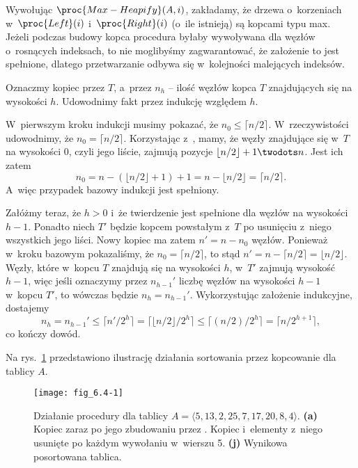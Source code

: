\exercise %
Wywołując $\proc{Max-Heapify}(A,i)$, zakładamy, że drzewa o~korzeniach w~$\proc{Left}(i)$ i~$\proc{Right}(i)$ (o~ile istnieją) są kopcami typu max.
Jeżeli podczas budowy kopca procedura  byłaby wywoływana dla węzłów o~rosnących indeksach, to nie moglibyśmy zagwarantować, że założenie to jest spełnione, dlatego przetwarzanie odbywa się w~kolejności malejących indeksów.

\exercise %
Oznaczmy kopiec przez $T$, a~przez $n_h$ -- ilość węzłów kopca $T$ znajdujących się na wysokości $h$.
Udowodnimy fakt przez indukcję względem $h$.

W~pierwszym kroku indukcji musimy pokazać, że $n_0\le\lceil n/2\rceil$.
W~rzeczywistości udowodnimy, że $n_0=\lceil n/2\rceil$.
Korzystając z~, mamy, że węzły znajdujące się w~$T$ na wysokości 0, czyli jego liście, zajmują pozycje $\lfloor n/2\rfloor+1\twodots n$.
Jest ich zatem
\[
    n_0 = n-(\lfloor n/2\rfloor+1)+1 = n-\lfloor n/2\rfloor = \lceil n/2\rceil.
\]
A~więc przypadek bazowy indukcji jest spełniony.

Załóżmy teraz, że $h>0$ i~że twierdzenie jest spełnione dla węzłów na wysokości $h-1$.
Ponadto niech $T'$ będzie kopcem powstałym z~$T$ po usunięciu z~niego wszystkich jego liści.
Nowy kopiec ma zatem $n'=n-n_0$ węzłów.
Ponieważ w~kroku bazowym pokazaliśmy, że $n_0=\lceil n/2\rceil$, to stąd $n'=n-\lceil n/2\rceil=\lfloor n/2\rfloor$.
Węzły, które w~kopcu $T$ znajdują się na wysokości $h$, w~$T'$ zajmują wysokość $h-1$, więc jeśli oznaczymy przez $n_{h-1}'$ liczbę węzłów na wysokości $h-1$ w~kopcu $T'$, to wówczas będzie $n_h=n_{h-1}'$.
Wykorzystując założenie indukcyjne, dostajemy
\[
    n_h = n_{h-1}' \le \lceil n'\!/2^h\rceil = \lceil\lfloor n/2\rfloor/2^h\rceil \le \lceil(n/2)/2^h\rceil = \lceil n/2^{h+1}\rceil,
\]
co kończy dowód.


\exercise %
Na rys.\ \ref{fig:6.4-1} przedstawiono ilustrację działania sortowania przez kopcowanie dla tablicy $A$.
\begin{figure}[ht]
	\begin{center}
		\texttt{[image: fig\_6.4-1]}
	\end{center}
	\caption{Działanie procedury  dla tablicy $A=\langle5,13,2,25,7,17,20,8,4\rangle$.
{\sffamily\bfseries(a)} Kopiec zaraz po jego zbudowaniu przez .
{\sffamily\bfseries{}} Kopiec i~elementy z~niego usunięte po każdym wywołaniu  w~wierszu 5.
{\sffamily\bfseries(j)} Wynikowa posortowana tablica.} \label{fig:6.4-1}
\end{figure}

